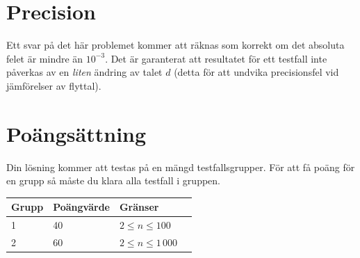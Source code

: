 \section*{Precision}
Ett svar på det här problemet kommer att räknas som korrekt om det absoluta felet är mindre än $10^{-3}$. Det är garanterat att resultatet för ett testfall inte påverkas av en \emph{liten} ändring av talet $d$ (detta för att undvika precisionsfel vid jämförelser av flyttal).

\section*{Poängsättning}

Din lösning kommer att testas på en mängd testfallsgrupper. För att få poäng för en grupp
så måste du klara alla testfall i gruppen.

\begin{tabular}{| l | l | l | l |}
\hline
Grupp & Poängvärde & Gränser \\ \hline
1     & 40         & $ 2 \le n \le 100$ \\ \hline
2     & 60         & $ 2 \le n \le 1\,000$ \\ \hline
\end{tabular}
